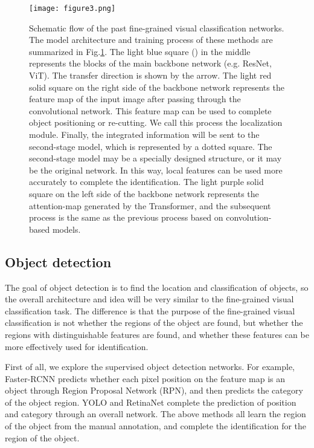 \documentclass[conference]{IEEEtran}
\begin{document}
\begin{figure}
\centerline{\texttt{[image: figure3.png]}}
\caption{Schematic flow of the past fine-grained visual classification networks. The model architecture and training process of these methods are summarized in Fig.\ref{fig3}. The light blue square () in the middle represents the blocks of the main backbone network (e.g. ResNet\cite{ResNet}, ViT\cite{ViT}). The transfer direction is shown by the arrow. The light red solid square on the right side of the backbone network represents the feature map of the input image after passing through the convolutional network. This feature map can be used to complete object positioning or re-cutting. We call this process the localization module. Finally, the integrated information will be sent to the second-stage model, which is represented by a dotted square. The second-stage model may be a specially designed structure, or it may be the original network. In this way, local features can be used more accurately to complete the identification. The light purple solid square on the left side of the backbone network represents the attention-map generated by the Transformer, and the subsequent process is the same as the previous process based on convolution-based models.}
\label{fig3}
\end{figure}

\subsection{Object detection}
The goal of object detection is to find the location and classification of objects, so the overall architecture and idea will be very similar to the fine-grained visual classification task. The difference is that the purpose of the fine-grained visual classification is not whether the regions of the object are found, but whether the regions with distinguishable features are found, and whether these features can be more effectively used for identification.

First of all, we explore the supervised object detection networks. For example, Faster-RCNN\cite{Faster_RCNN} predicts whether each pixel position on the feature map is an object through Region Proposal Network (RPN), and then predicts the category of the object region. YOLO\cite{YOLO}\cite{YOLO_v4} and RetinaNet\cite{RetinaNet} complete the prediction of position and category through an overall network. The above methods all learn the region of the object from the manual annotation, and complete the identification for the region of the object.
\end{document}
